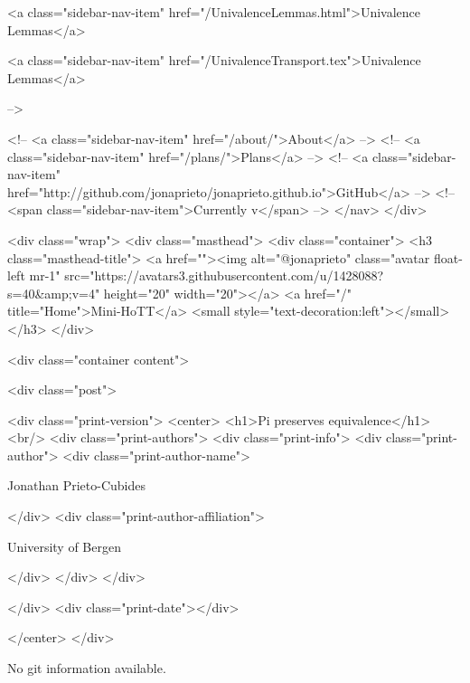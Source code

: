       
    
      
        
          <a class="sidebar-nav-item" href="/UnivalenceLemmas.html">Univalence Lemmas</a>
        
      
    
      
        
          <a class="sidebar-nav-item" href="/UnivalenceTransport.tex">Univalence Lemmas</a>
        
      
     -->

    <!-- <a class="sidebar-nav-item" href="/about/">About</a> -->
    <!-- <a class="sidebar-nav-item" href="/plans/">Plans</a> -->
    <!-- <a class="sidebar-nav-item" href="http://github.com/jonaprieto/jonaprieto.github.io">GitHub</a> -->
    <!-- <span class="sidebar-nav-item">Currently v</span> -->
  </nav>
</div>

    <div class="wrap">
      <div class="masthead">
        <div class="container">
          <h3 class="masthead-title">
            <a href=""><img alt="@jonaprieto" class="avatar float-left mr-1" src="https://avatars3.githubusercontent.com/u/1428088?s=40&amp;v=4" height="20" width="20"></a>
            <a href="/" title="Home">Mini-HoTT</a>
            <small style="text-decoration:left"></small>
          </h3>
        </div>
      
      <div class="container content">
        







<div class="post">

  <div class="print-version">
    <center>
      <h1>Pi preserves equivalence</h1><br/>
        <div class="print-authors">
          <div class="print-info">
            <div class="print-author">
              <div class="print-author-name">
                
                  Jonathan Prieto-Cubides
                
              </div>
              <div class="print-author-affiliation">
                
                  University of Bergen
                
                </div>
            </div>
          </div>
          
          
        </div>
        <div class="print-date"></div>
        
        
    </center>
  </div>

  
  No git information available.
  
